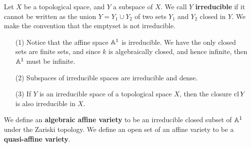 \begin{definition}
    Let $X$ be a topological space, and  $Y$ a subspace of  $X$. We call  $Y$
     \textbf{irreducible} if it cannot be written as the union $Y=Y_1 \cup Y_2$
     of two sets $Y_1$ and $Y_2$ closed in $Y$. We make the convention that the
     emptyset is not irreducible.
\end{definition}

\begin{example}\label{example_1.3}
    \begin{enumerate}
        \item[(1)] Notice that the affine space $\mathbb{A}^1$ is irreducible. We have
            the only closed sets are finite sets, and since  $k$ is
            algebraically closed, and hence infinite, then  $\mathbb{A}^1$ must be
            infinite.

        \item[(2)] Subspaces of irreducible spaces are irreducible and dense.

        \item[(3)] If $Y$ is an irreducible space of a topological space  $X$,
            then the closure  $\operatorname{cl}{Y}$ is also irreducible in $X$.
    \end{enumerate}
\end{example}

\begin{definition}
    We define an \textbf{algebraic affine variety} to be an irreducible closed
    subset of $\mathbb{A}^1$ under the Zariski topology. We define an open set of an
    affine variety to be a  \textbf{quasi-affine variety}.
\end{definition}
